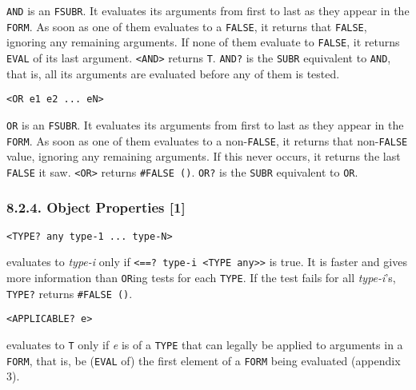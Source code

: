 \documentclass[a4paper,]{article}
\begin{document}
\texttt{AND}  is an \texttt{FSUBR}. It evaluates its arguments from first
to last as they appear in the \texttt{FORM}. As soon as one of them evaluates to a \texttt{FALSE}, it returns that
\texttt{FALSE}, ignoring any remaining arguments. If none of them evaluate to \texttt{FALSE}, it returns \texttt{EVAL} of
its last argument. \texttt{\textless{}AND\textgreater{}} returns \texttt{T}. \texttt{AND?}  is
the \texttt{SUBR} equivalent to \texttt{AND}, that is, all its arguments are evaluated before any of them is tested.

\begin{verbatim}
<OR e1 e2 ... eN>
\end{verbatim}

 \texttt{OR} is an \texttt{FSUBR}. It evaluates its arguments from first to last as they appear
in the \texttt{FORM}. As soon as one of them evaluates to a non-\texttt{FALSE}, it returns that non-\texttt{FALSE} value,
ignoring any remaining arguments. If this never occurs, it returns the last \texttt{FALSE} it saw.
\texttt{\textless{}OR\textgreater{}} returns \texttt{\#FALSE\ ()}. \texttt{OR?} is the
\texttt{SUBR} equivalent to \texttt{OR}.

\subsubsection{8.2.4. Object Properties {[}1{]}}\label{object-properties-1}

\begin{verbatim}
<TYPE? any type-1 ... type-N>
\end{verbatim}

 evaluates to \emph{type-i} only if
\texttt{\textless{}==?\ type-i\ \textless{}TYPE\ any\textgreater{}\textgreater{}} is true. It is
faster and gives more information than \texttt{OR}ing tests for each \texttt{TYPE}. If the test fails for all
\emph{type-i}'s, \texttt{TYPE?} returns \texttt{\#FALSE\ ()}.

\begin{verbatim}
<APPLICABLE? e>
\end{verbatim}

 evaluates to \texttt{T} only if \emph{e} is of a \texttt{TYPE} that can legally be
applied to arguments in a \texttt{FORM}, that is, be (\texttt{EVAL} of) the first element of a \texttt{FORM} being
evaluated (appendix 3).
\end{document}
